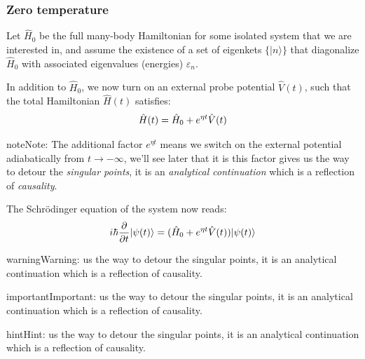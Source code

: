 \documentclass[letterpaper,10pt,english]{sphinxmanual}
\begin{document}
\subsubsection{Zero temperature}
\label{CMP/linear response theory/Kubo_formula:id2}\label{CMP/linear response theory/Kubo_formula:zero-temperature}
Let \(\hat{H}_0\) be the full many-body Hamiltonian for some isolated system that we are interested in, and assume the existence of a set of eigenkets \(\{|n\rangle\}\) that diagonalize \(\hat{H}_0\) with associated
eigenvalues (energies) \(\varepsilon_n\).

In addition to \(\hat{H}_0\), we now turn on an external probe potential \(\hat{V}(t)\), such that the total Hamiltonian \(\hat{H}(t)\) satisfies:
\begin{gather}
\begin{split}\hat{H}(t)=\hat{H}_0+e^{\eta t}\hat{V}(t)\end{split}\notag
\end{gather}
\begin{notice}{note}{Note:}
The additional factor \(e^{\eta t}\) means we switch on the external potential adiabatically from \(t\to -\infty\), we'll see later that it is this factor gives us the way to detour the \emph{singular points}, it is an \emph{analytical continuation} which is a reflection of \emph{causality}.
\end{notice}

The Schrödinger equation of the system now reads:
\begin{gather}
\begin{split}i\hbar\frac{\partial}{\partial t}|\psi(t)\rangle=(\hat{H}_0+e^{\eta t}\hat{V}(t))|\psi(t)\rangle\end{split}\notag
\end{gather}
\begin{notice}{warning}{Warning:}
us the way to detour the singular points, it is an analytical continuation which is a reflection of causality.
\end{notice}

\begin{notice}{important}{Important:}
us the way to detour the singular points, it is an analytical continuation which is a reflection of causality.
\end{notice}

\begin{notice}{hint}{Hint:}
us the way to detour the singular points, it is an analytical continuation which is a reflection of causality.
\end{notice}
\end{document}
